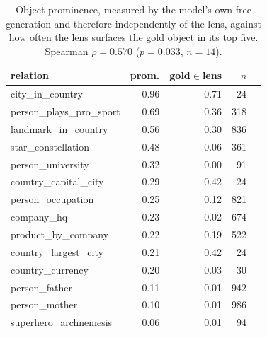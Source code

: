 \begin{table}[t]
\centering\small
\caption{Object prominence, measured by the model's own free
generation and therefore independently of the lens, against how often
the lens surfaces the gold object in its top five. Spearman
$\rho = 0.570$ ($p = 0.033$, $n = 14$).}
\label{tab:prominence}

\begin{tabular}{@{}lrrrr@{}}
\toprule
relation & prom.  & gold$\in$lens & $n$ \\
\midrule
city\_in\_country & 0.96  & 0.71 & 24 \\
person\_plays\_pro\_sport & 0.69  & 0.36 & 318 \\
landmark\_in\_country & 0.56  & 0.30 & 836 \\
star\_constellation & 0.48  & 0.06 & 361 \\
person\_university & 0.32  & 0.00 & 91 \\
country\_capital\_city & 0.29  & 0.42 & 24 \\
person\_occupation & 0.25  & 0.12 & 821 \\
company\_hq & 0.23  & 0.02 & 674 \\
product\_by\_company & 0.22  & 0.19 & 522 \\
country\_largest\_city & 0.21  & 0.42 & 24 \\
country\_currency & 0.20 & 0.03 & 30 \\
person\_father & 0.11 & 0.01 & 942 \\
person\_mother & 0.10  & 0.01 & 986 \\
superhero\_archnemesis & 0.06  & 0.01 & 94 \\
\bottomrule
\end{tabular}
\end{table}
